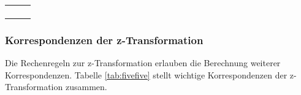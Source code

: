 \begin{table}[H]
{\begin{tabular}{| c | c | c |}
\parbox[c][0.5in][c]{1.9in}{} & 
\parbox[c][0.5in][c]{2.2in}{} &
\parbox[c][0.5in][c]{2.2in}{}\\
\hline

\parbox[c][0.5in][c]{1.9in}{} & 
\parbox[c][0.5in][c]{2.2in}{} &
\parbox[c][0.5in][c]{2.2in}{}\\
\hline

\parbox[c][0.5in][c]{1.9in}{} & 
\parbox[c][0.5in][c]{2.2in}{} &
\parbox[c][0.5in][c]{2.2in}{}\\
\hline

\parbox[c][0.5in][c]{1.9in}{} & 
\parbox[c][0.5in][c]{2.2in}{} &
\parbox[c][0.5in][c]{2.2in}{}\\
\hline

\parbox[c][0.5in][c]{1.9in}{} & 
\parbox[c][0.5in][c]{2.2in}{} &
\parbox[c][0.5in][c]{2.2in}{}\\
\hline
\end{tabular}%
}
\label{tab:fivefour}
\end{table}

\clearpage

\subsubsection{Korrespondenzen der z-Transformation}

\noindent Die Rechenregeln zur z-Transformation erlauben die Berechnung weiterer Korrespondenzen. Tabelle \ref{tab:fivefive} stellt wichtige Korrespondenzen der z-Transformation zusammen.

